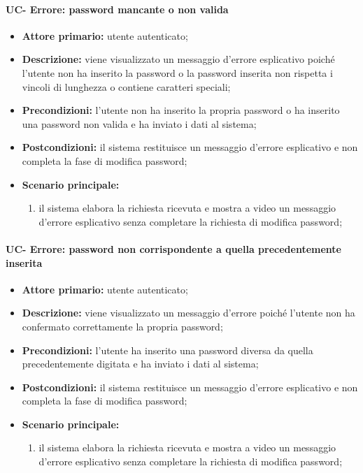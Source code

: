 \paragraph{UC- Errore: password mancante o non valida}


	\begin{itemize}
		\item \textbf{Attore primario:} utente autenticato;

		\item \textbf{Descrizione:} viene visualizzato un messaggio d'errore esplicativo poiché l'utente non ha inserito la password o la password inserita non rispetta i vincoli di lunghezza o contiene caratteri speciali;

		\item \textbf{Precondizioni:} l'utente non ha inserito la propria password o ha inserito una password non valida e ha inviato i dati al sistema;

		\item \textbf{Postcondizioni:} il sistema restituisce un messaggio d'errore esplicativo e non completa la fase di modifica password;

		\item \textbf{Scenario principale:}
	  		\begin{enumerate}
		  		\item il sistema elabora la richiesta ricevuta e mostra a video un messaggio d'errore esplicativo senza completare la richiesta di modifica password; 
	  		\end{enumerate}
	\end{itemize}


\paragraph{UC- Errore: password non corrispondente a quella precedentemente inserita}

	\begin{itemize}
		\item \textbf{Attore primario:} utente autenticato;

		\item \textbf{Descrizione:}  viene visualizzato un messaggio d'errore poiché l'utente non ha confermato correttamente la propria password;

		\item \textbf{Precondizioni:} l'utente ha inserito una password diversa da quella precedentemente digitata e ha inviato i dati al sistema;

		\item \textbf{Postcondizioni:} il sistema restituisce un messaggio d'errore esplicativo e non completa la fase di modifica password;

		\item \textbf{Scenario principale:}
	  		\begin{enumerate}
		  		\item il sistema elabora la richiesta ricevuta e mostra a video un messaggio d'errore esplicativo senza completare la richiesta di modifica password; 
	  		\end{enumerate}
	\end{itemize}

